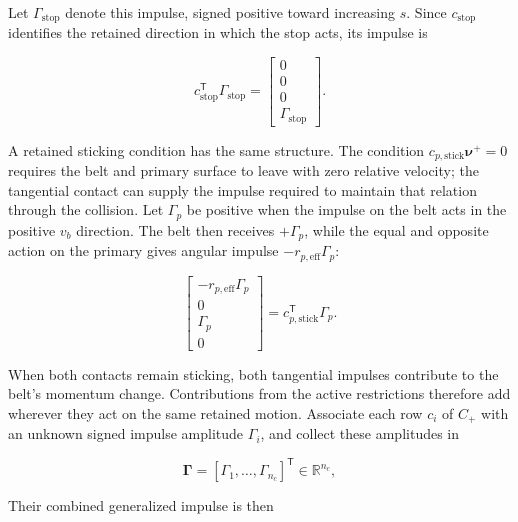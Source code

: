 \documentclass[11pt]{report}
\numberwithin{equation}{section}
\begin{document}
Let \(\Gamma_{\mathrm{stop}}\) denote this impulse, signed positive toward
increasing \(s\).  Since \(c_{\mathrm{stop}}\) identifies the retained
direction in which the stop acts, its impulse is

\begin{equation}
    c_{\mathrm{stop}}^{\mathsf T}\Gamma_{\mathrm{stop}}
    =
    \begin{bmatrix}
        0\\
        0\\
        0\\
        \Gamma_{\mathrm{stop}}
    \end{bmatrix}.
    \label{eq:finite_event_stop_impulse}
\end{equation}

A retained sticking condition has the same structure.  The condition
\(c_{p,\mathrm{stick}}\boldsymbol{\nu}^+=0\) requires the belt and primary
surface to leave with zero relative velocity; the tangential contact can
supply the impulse required to maintain that relation through the collision.
Let \(\Gamma_p\) be positive when the impulse on the belt acts in the positive
\(v_b\) direction.  The belt then receives \(+\Gamma_p\), while the equal and
opposite action on the primary gives angular impulse
\(-r_{p,\mathrm{eff}}\Gamma_p\):

\begin{equation}
    \begin{bmatrix}
        -r_{p,\mathrm{eff}}\Gamma_p\\0\\\Gamma_p\\0
    \end{bmatrix}
    =
    c_{p,\mathrm{stick}}^{\mathsf T}\Gamma_p.
    \label{eq:finite_event_primary_constraint_impulse}
\end{equation}

When both contacts remain sticking, both tangential impulses contribute
to the belt's momentum change. Contributions from the active restrictions
therefore add wherever they act on the same retained motion. Associate each 
row \(c_i\) of \(C_+\) with an unknown signed impulse amplitude 
\(\Gamma_i\), and collect these amplitudes in

\begin{equation}
    \boldsymbol\Gamma=
    [\Gamma_1,\ldots,\Gamma_{n_c}]^{\mathsf T}\in\mathbb R^{n_c},
\end{equation}

Their combined generalized impulse is then
\end{document}
